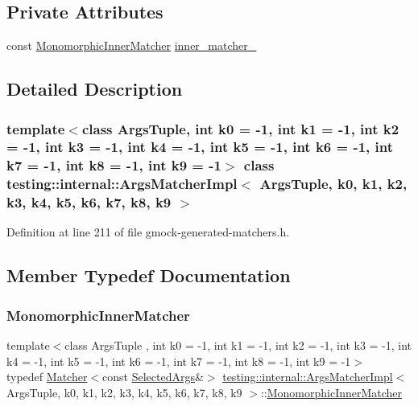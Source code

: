 \subsection*{Private Attributes}
\begin{DoxyCompactItemize}
\item 
const \hyperlink{classtesting_1_1internal_1_1ArgsMatcherImpl_ab90d2c074b2072d6c39bf26209fb941f}{Monomorphic\+Inner\+Matcher} \hyperlink{classtesting_1_1internal_1_1ArgsMatcherImpl_a719ba7e85d3381661021d699c9978ed0}{inner\+\_\+matcher\+\_\+}
\end{DoxyCompactItemize}


\subsection{Detailed Description}
\subsubsection*{template$<$class Args\+Tuple, int k0 = -\/1, int k1 = -\/1, int k2 = -\/1, int k3 = -\/1, int k4 = -\/1, int k5 = -\/1, int k6 = -\/1, int k7 = -\/1, int k8 = -\/1, int k9 = -\/1$>$\newline
class testing\+::internal\+::\+Args\+Matcher\+Impl$<$ Args\+Tuple, k0, k1, k2, k3, k4, k5, k6, k7, k8, k9 $>$}



Definition at line 211 of file gmock-\/generated-\/matchers.\+h.



\subsection{Member Typedef Documentation}
\mbox{\label{classtesting_1_1internal_1_1ArgsMatcherImpl_ab90d2c074b2072d6c39bf26209fb941f}} 
\subsubsection{\texorpdfstring{Monomorphic\+Inner\+Matcher}{MonomorphicInnerMatcher}}
{\footnotesize\ttfamily template$<$class Args\+Tuple , int k0 = -\/1, int k1 = -\/1, int k2 = -\/1, int k3 = -\/1, int k4 = -\/1, int k5 = -\/1, int k6 = -\/1, int k7 = -\/1, int k8 = -\/1, int k9 = -\/1$>$ \\
typedef \hyperlink{classtesting_1_1Matcher}{Matcher}$<$const \hyperlink{classtesting_1_1internal_1_1ArgsMatcherImpl_ab061679f6251e56ccbedaf0c316d00ff}{Selected\+Args}\&$>$ \hyperlink{classtesting_1_1internal_1_1ArgsMatcherImpl}{testing\+::internal\+::\+Args\+Matcher\+Impl}$<$ Args\+Tuple, k0, k1, k2, k3, k4, k5, k6, k7, k8, k9 $>$\+::\hyperlink{classtesting_1_1internal_1_1ArgsMatcherImpl_ab90d2c074b2072d6c39bf26209fb941f}{Monomorphic\+Inner\+Matcher}}



